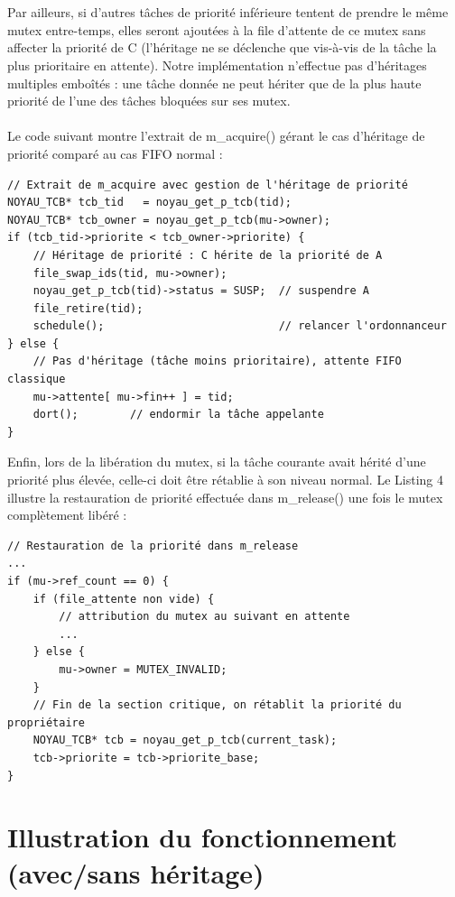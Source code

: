 \documentclass{latexPackage/utc-report/utc-report}
\begin{document}
\\\\
Par ailleurs, si d’autres tâches de priorité inférieure tentent de prendre le même mutex entre-temps, elles seront ajoutées à la file d’attente de ce mutex sans affecter la priorité de C (l’héritage ne se déclenche que vis-à-vis de la tâche la plus prioritaire en attente). Notre implémentation n’effectue pas d’héritages multiples emboîtés : une tâche donnée ne peut hériter que de la plus haute priorité de l’une des tâches bloquées sur ses mutex.
\\\\
Le code suivant montre l’extrait de m\_acquire() gérant le cas d’héritage de priorité comparé au cas FIFO normal :

\begin{verbatim}
// Extrait de m_acquire avec gestion de l'héritage de priorité
NOYAU_TCB* tcb_tid   = noyau_get_p_tcb(tid);
NOYAU_TCB* tcb_owner = noyau_get_p_tcb(mu->owner);
if (tcb_tid->priorite < tcb_owner->priorite) {
    // Héritage de priorité : C hérite de la priorité de A
    file_swap_ids(tid, mu->owner);
    noyau_get_p_tcb(tid)->status = SUSP;  // suspendre A
    file_retire(tid);
    schedule();                           // relancer l'ordonnanceur
} else {
    // Pas d'héritage (tâche moins prioritaire), attente FIFO classique
    mu->attente[ mu->fin++ ] = tid;
    dort();        // endormir la tâche appelante
}
\end{verbatim}

Enfin, lors de la libération du mutex, si la tâche courante avait hérité d’une priorité plus élevée, celle-ci doit être rétablie à son niveau normal. Le Listing 4 illustre la restauration de priorité effectuée dans m\_release() une fois le mutex complètement libéré :

\begin{verbatim}
// Restauration de la priorité dans m_release
...
if (mu->ref_count == 0) {
    if (file_attente non vide) {
        // attribution du mutex au suivant en attente
        ...
    } else {
        mu->owner = MUTEX_INVALID;
    }
    // Fin de la section critique, on rétablit la priorité du propriétaire
    NOYAU_TCB* tcb = noyau_get_p_tcb(current_task);
    tcb->priorite = tcb->priorite_base;
}
\end{verbatim}

\pagebreak

\section{Illustration du fonctionnement (avec/sans héritage)}
\end{document}
